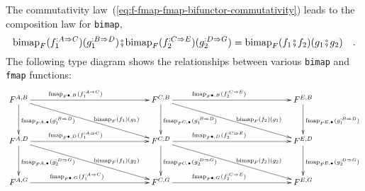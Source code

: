 The commutativity law~(\ref{eq:f-fmap-fmap-bifunctor-commutativity})
leads to the composition law for \lstinline!bimap!,
\begin{equation}
\text{bimap}_{F}(f_{1}^{:A\Rightarrow C})(g_{1}^{:B\Rightarrow D})\bef\text{bimap}_{F}(f_{2}^{:C\Rightarrow E})(g_{2}^{:D\Rightarrow G})=\text{bimap}_{F}(f_{1}\bef f_{2})(g_{1}\bef g_{2})\quad.\label{eq:f-bimap-composition-law}
\end{equation}
The following type diagram shows the relationships between various
\lstinline!bimap! and \lstinline!fmap! functions:
\[
\xymatrix{\xyScaleY{3.0pc}\xyScaleX{12.0pc}F^{A,B}\ar[rd]\sp(0.6){~~~\text{bimap}_{F}(f_{1})(g_{1})}\ar[r]\sp(0.4){\text{fmap}_{F^{\bullet,B}}(f_{1}^{:A\Rightarrow C})}\ar[d]\sp(0.5){\text{fmap}_{F^{A,\bullet}}(g_{1}^{:B\Rightarrow D})} & F^{C,B}\ar[rd]\sp(0.6){~~~\text{bimap}_{F}(f_{2})(g_{1})}\ar[r]\sp(0.4){~\text{fmap}_{F^{\bullet,B}}(f_{2}^{:C\Rightarrow E})}\ar[d]\sp(0.5){\text{fmap}_{F^{C,\bullet}}(g_{1}^{:B\Rightarrow D})~~~} & F^{E,B}\ar[d]\sp(0.5){\text{fmap}_{F^{E,\bullet}}(g_{1}^{:B\Rightarrow D})}\\
F^{A,D}\ar[rd]\sp(0.6){~~~\text{bimap}_{F}(f_{1})(g_{2})}\ar[r]\sp(0.4){\text{fmap}_{F^{\bullet,D}}(f_{1}^{:A\Rightarrow C})}\ar[d]\sp(0.5){\text{fmap}_{F^{A,\bullet}}(g_{2}^{:D\Rightarrow G})} & F^{C,D}\ar[rd]\sp(0.6){~~~\text{bimap}_{F}(f_{2})(g_{2})}\ar[r]\sp(0.4){~\text{fmap}_{F^{\bullet,D}}(f_{2}^{:C\Rightarrow E})}\ar[d]\sp(0.5){\text{fmap}_{F^{C,\bullet}}(g_{2}^{:D\Rightarrow G})~~~} & F^{E,D}\ar[d]\sp(0.5){\text{fmap}_{F^{E,\bullet}}(g_{2}^{:D\Rightarrow G})}\\
F^{A,G}\ar[r]\sp(0.4){~\text{fmap}_{F^{\bullet,G}}(f_{1}^{:A\Rightarrow C})} & F^{C,G}\ar[r]\sp(0.4){~\text{fmap}_{F^{\bullet,G}}(f_{2}^{:C\Rightarrow E})} & F^{E,G}
}
\]


